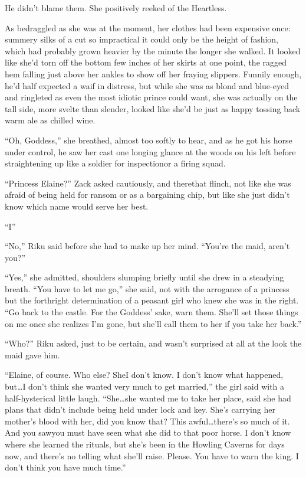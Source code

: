 He didn't blame them. She positively reeked of the Heartless.

As bedraggled as she was at the moment, her clothes had been expensive once: summery silks of a cut so impractical it could only be the height of fashion, which had probably grown heavier by the minute the longer she walked. It looked like she'd torn off the bottom few inches of her skirts at one point, the ragged hem falling just above her ankles to show off her fraying slippers. Funnily enough, he'd half expected a waif in distress, but while she was as blond and blue-eyed and ringleted as even the most idiotic prince could want, she was actually on the tall side, more svelte than slender, looked like she'd be just as happy tossing back warm ale as chilled wine.

``Oh, Goddess,'' she breathed, almost too softly to hear, and as he got his horse under control, he saw her cast one longing glance at the woods on his left before straightening up like a soldier for inspection\textemdash or a firing squad.

``Princess Elaine?'' Zack asked cautiously, and there\textemdash that flinch, not like she was afraid of being held for ransom or as a bargaining chip, but like she just didn't know which name would serve her best.

``I\textemdash ''

``No,'' Riku said before she had to make up her mind. ``You're the maid, aren't you?''

``Yes,'' she admitted, shoulders slumping briefly until she drew in a steadying breath. ``You have to let me go,'' she said, not with the arrogance of a princess but the forthright determination of a peasant girl who knew she was in the right. ``Go back to the castle. For the Goddess' sake, warn them. She'll set those things on me once she realizes I'm gone, but she'll call them to her if you take her back.''

``Who?'' Riku asked, just to be certain, and wasn't surprised at all at the look the maid gave him.

``Elaine, of course. Who else? She\textemdash I don't know. I don't know what happened, but\ldots I don't think she wanted very much to get married,'' the girl said with a half-hysterical little laugh. ``She\ldots she wanted me to take her place, said she had plans that didn't include being held under lock and key. She's carrying her mother's blood with her, did you know that? This awful\ldots there's so much of it. And you saw\textemdash you must have seen what she did to that poor horse. I don't know where she learned the rituals, but she's been in the Howling Caverns for days now, and there's no telling what she'll raise. Please. You have to warn the king. I don't think you have much time.''


